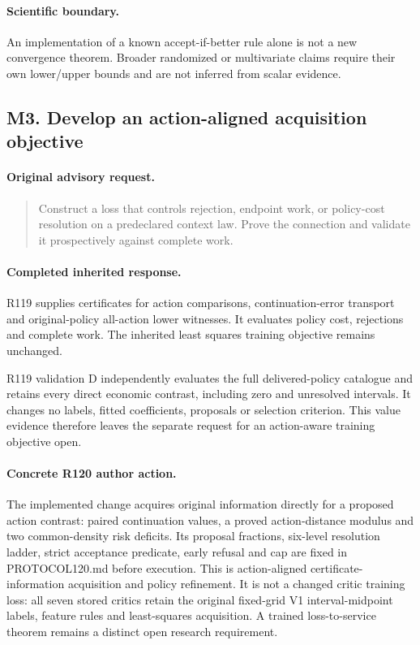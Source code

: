 \paragraph{Scientific boundary.}
An implementation of a known accept-if-better rule alone is not a new convergence theorem. Broader randomized or multivariate claims require their own lower/upper bounds and are not inferred from scalar evidence.

\subsection{M3. Develop an action-aligned acquisition objective}
\label{response120:M3}
\paragraph{Original advisory request.}
\begin{quote}
Construct a loss that controls rejection, endpoint work, or policy-cost resolution on a predeclared context law. Prove the connection and validate it prospectively against complete work.
\end{quote}
\paragraph{Completed inherited response.}
R119 supplies certificates for action comparisons, continuation-error transport and original-policy all-action lower witnesses. It evaluates policy cost, rejections and complete work. The inherited least squares training objective remains unchanged.

R119 validation D independently evaluates the full delivered-policy catalogue and retains every direct economic contrast, including zero and unresolved intervals. It changes no labels, fitted coefficients, proposals or selection criterion. This value evidence therefore leaves the separate request for an action-aware training objective open.
\paragraph{Concrete R120 author action.}
The implemented change acquires original information directly for a proposed action contrast: paired continuation values, a proved action-distance modulus and two common-density risk deficits. Its proposal fractions, six-level resolution ladder, strict acceptance predicate, early refusal and cap are fixed in PROTOCOL120.md before execution. This is action-aligned certificate-information acquisition and policy refinement. It is not a changed critic training loss: all seven stored critics retain the original fixed-grid V1 interval-midpoint labels, feature rules and least-squares acquisition. A trained loss-to-service theorem remains a distinct open research requirement.
